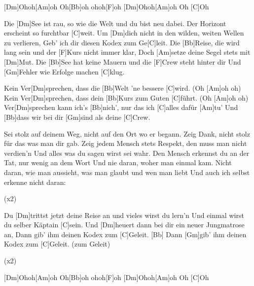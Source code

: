 

\begin{guitar}
	[Dm]Ohoh[Am]oh Oh[Bb]oh ohoh[F]oh
	[Dm]Ohoh[Am]oh Oh [C]Oh
	
	Die [Dm]See ist rau, so wie die Welt und du bist neu dabei.
	Der Horizont erscheint so furchtbar [C]weit.
	Um [Dm]dich nicht in den wilden, weiten Wellen zu verlieren,
	Geb' ich dir diesen Kodex zum Ge[C]leit.
	Die [Bb]Reise, die wird lang sein und der [F]Kurs nicht immer klar,
	Doch [Am]setze deine Segel stets mit [Dm]Mut.
	Die [Bb]See hat keine Mauern und die [F]Crew steht hinter dir
	Und [Gm]Fehler wie Erfolge machen [C]klug.
	
	Kein Ver[Dm]sprechen, dass die [Bb]Welt 'ne bessere [C]wird. (Oh [Am]oh oh)
	Kein Ver[Dm]sprechen, dass dein [Bb]Kurs zum Guten [C]führt. (Oh [Am]oh oh)
	Ver[Dm]sprechen kann ich's [Bb]nich', nur das ich [C]alles dafür [Am]tu'
	Und [Bb]dass wir bei dir [Gm]sind als deine [C]Crew.
	
	 
	
	Sei stolz auf deinem Weg, nicht auf den Ort wo er begann.
	Zeig Dank, nicht stolz für das was man dir gab.
	Zeig jedem Mensch stets Respekt, den muss man nicht verdien'n
	Und alles was du sagen wirst sei wahr.
	Den Mensch erkennst du an der Tat, nur wenig an dem Wort
	Und nie daran, woher man einmal kam.
	Nicht daran, wie man aussieht, was man glaubt und wen man liebt
	Und auch ich selbst erkenne nicht daran:
	
	  (x2)
	
	Du [Dm]trittst jetzt deine Reise an und vieles wirst du lern'n
	Und einmal wirst du selber Käptain [C]sein.
	Und [Dm]heuert dann bei dir ein neuer Jungmatrose an,
	Dann gib' ihm deinen Kodex zum [C]Geleit. [Bb]{}
	Dann [Gm]gib' ihm deinen Kodex zum [C]Geleit. (zum Geleit)
	
	  (x2)
	
	[Dm]Ohoh[Am]oh Oh[Bb]oh ohoh[F]oh
	[Dm]Ohoh[Am]oh Oh [C]Oh
\end{guitar}